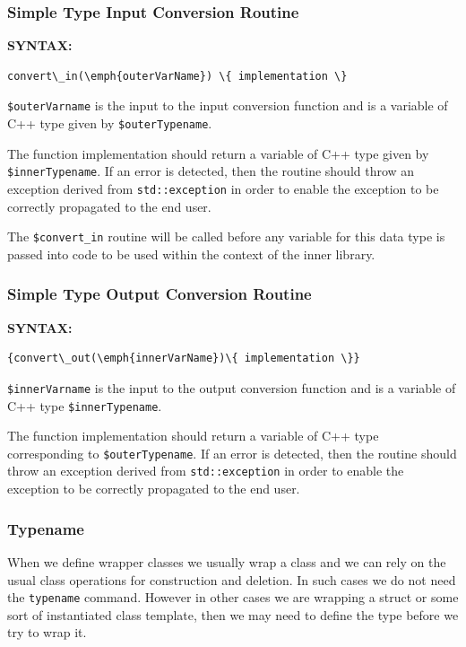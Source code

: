\subsubsection*{Simple Type Input Conversion Routine}

\textbf{SYNTAX:}
\nopagebreak
\begin{Verbatim}[commandchars=\\\{\}]
    convert\_in(\emph{outerVarName}) \{ implementation \}
\end{Verbatim}

\texttt{\$outerVarname} is the input to the input conversion function and is a variable of C++ type given by \texttt{\$outerTypename}.

The function implementation should return a variable of C++ type given by \texttt{\$innerTypename}. If an error is detected, then the routine should throw an exception derived from \texttt{std::exception} in order to enable the exception to be correctly propagated to the end user.

The \texttt{\$convert\_in} routine will be called before any variable for this data type is passed into code to be used within the context of the inner library.

\subsubsection*{Simple Type Output Conversion Routine}

\textbf{SYNTAX:}
\nopagebreak
\begin{Verbatim}[commandchars=\\\{\}]
{convert\_out(\emph{innerVarName})\{ implementation \}}
\end{Verbatim}

\texttt{\$innerVarname} is the input to the output conversion function and is a variable of C++ type \texttt{\$innerTypename}.

The function implementation should return a variable of C++ type corresponding to \texttt{\$outerTypename}. If an error is detected, then the routine should throw an exception derived from \texttt{std::exception} in order to enable the exception to be correctly propagated to the end user.


\subsubsection{Typename} \label{typename}

When we define wrapper classes we usually wrap a class and we can rely on the usual class operations for construction and deletion. In such cases we do not need the \texttt{typename} command. However in other cases we are wrapping a struct or some sort of instantiated class template, then we may need to define the type before we try to wrap it.

